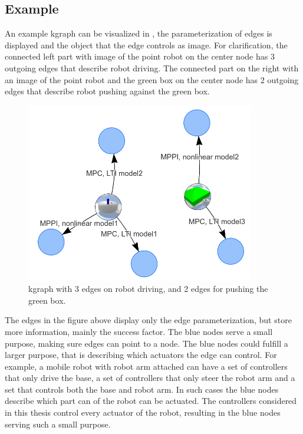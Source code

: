 \subsection{Example}%
\label{subsec:kgraph_example}
An example \ac{kgraph} can be visualized in , the parameterization of edges is displayed and the object that the edge controls as image. For clarification, the connected left part with image of the point robot on the center node has 3 outgoing edges that describe robot driving. The connected part on the right with an image of the point robot and the green box on the center node has 2 outgoing edges that describe robot pushing against the green box.\bs

\begin{figure}[H]
    \centering
    \includegraphics[width=10cm]{figures/proposed_method/kgraph_example}
    \caption{\ac{kgraph} with 3 edges on robot driving, and 2 edges for pushing the green box.}%
    \label{fig:kgraph_example}
\end{figure}

The edges in the figure above display only the edge parameterization, but store more information, mainly the success factor. The blue nodes serve a small purpose, making sure edges can point to a node. The blue nodes could fulfill a larger purpose, that is describing which actuators the edge can control. For example, a mobile robot with robot arm attached can have a set of controllers that only drive the base, a set of controllers that only steer the robot arm and a set that controls both the base and robot arm. In such cases the blue nodes describe which part can of the robot can be actuated. The controllers considered in this thesis control every actuator of the robot, resulting in the blue nodes serving such a small purpose.\bs
